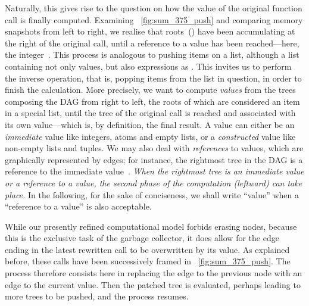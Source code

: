 Naturally, this gives rise to the question on how the value of the
original function call is finally computed. Examining
\fig~\vref{fig:sum_375_push} and comparing memory snapshots from left
to right, we realise that roots~(\erlcode{+}) have been accumulating
at the right of the original call, until a reference to a value has
been reached---here, the integer~. This process is
analogous to pushing items on a list, although a list containing not
only values, but also expressions as . This
invites us to perform the inverse operation, that is, popping items
from the list in question, in order to finish the calculation. More
precisely, we want to compute \emph{values} from the trees composing
the DAG from right to left, the roots of which are considered an item
in a special list, until the tree of the original call is reached and
associated with its own value---which is, by definition, the final
result. A value can either be an \emph{immediate} value like integers,
atoms and empty lists, or a \emph{constructed} value like
non\hyp{}empty lists and tuples. We may also deal with
\emph{references} to values, which are graphically represented by
edges; for instance, the rightmost tree in the DAG is a reference to
the immediate value~. \emph{When the rightmost tree is an
  immediate value or a reference to a value, the second phase of the
  computation (leftward) can take place.} In the following, for the
sake of conciseness, we shall write ``value'' when a ``reference to a
value'' is also acceptable.

While our presently refined computational model forbids erasing nodes,
because this is the exclusive task of the garbage collector, it does
allow for the edge ending in the latest rewritten call to be
overwritten by its value. As explained before, these calls have been
successively framed in \fig~\vref{fig:sum_375_push}. The process
therefore consists here in replacing the edge to the previous node
 with an edge to the current value. Then the patched tree
is evaluated, perhaps leading to more trees to be pushed, and the
process resumes.

